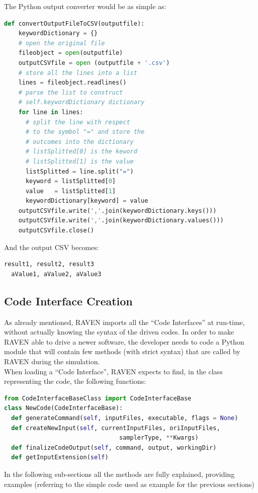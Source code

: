 The Python output converter would be as simple as:
\begin{lstlisting}[language=python]
def convertOutputFileToCSV(outputfile):
    keywordDictionary = {}
    # open the original file
    fileobject = open(outputfile)
    outputCSVfile = open (outputfile + '.csv')
    # store all the lines into a list
    lines = fileobject.readlines()
    # parse the list to construct 
    # self.keywordDictionary dictionary
    for line in lines:
      # split the line with respect
      # to the symbol "=" and store the
      # outcomes into the dictionary
      # listSplitted[0] is the keword
      # listSplitted[1] is the value
      listSplitted = line.split("=")
      keyword = listSplitted[0]
      value   = listSplitted[1]
      keywordDictionary[keyword] = value
    outputCSVfile.write(','.join(keywordDictionary.keys()))
    outputCSVfile.write(','.join(keywordDictionary.values()))
    outputCSVfile.close()
\end{lstlisting} 
And the output CSV becomes:
\begin{lstlisting}[language=python]
  result1, result2, result3
  aValue1, aValue2, aValue3 
\end{lstlisting} 
\subsection{Code Interface Creation} 
\label{subsec:codeinterfacecreation}
As already mentioned, RAVEN imports all the ``Code Interfaces'' at run-time, 
without actually knowing the syntax of the driven codes. In order to make RAVEN
able to drive a newer software, the developer needs to code a Python module 
that will contain few methods (with strict syntax) that are called by RAVEN during the simulation.
\\ When loading a ``Code Interface'', RAVEN expects to find, in the class representing the code,
 the following functions:
\begin{lstlisting}[language=python]
from CodeInterfaceBaseClass import CodeInterfaceBase
class NewCode(CodeInterfaceBase):
  def generateCommand(self, inputFiles, executable, flags = None)
  def createNewInput(self, currentInputFiles, oriInputFiles,
                                samplerType, **Kwargs)                           
  def finalizeCodeOutput(self, command, output, workingDir)
  def getInputExtension(self)
\end{lstlisting} 
In the following sub-sections all the methods are fully explained, providing examples
 (referring to the simple code used as example for the previous sections)
